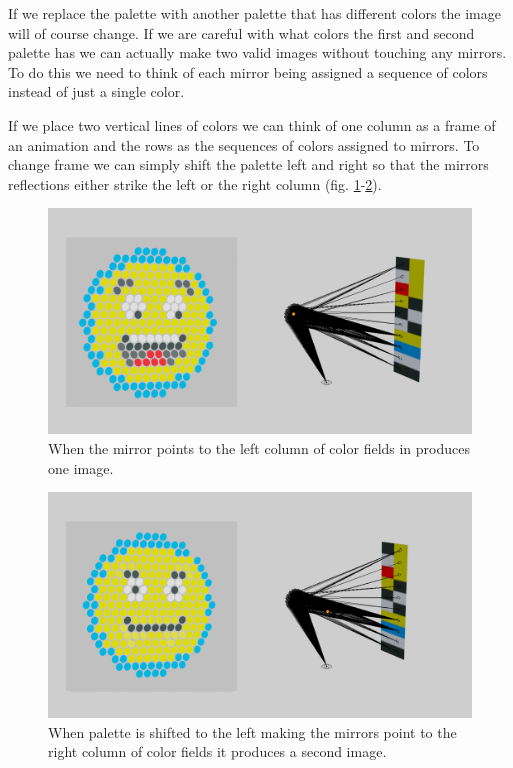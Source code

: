 \documentclass{article}
\begin{document}
If we replace the palette with another palette that has different
colors the image will of course change. If we are careful with what
colors the first and second palette has we can actually make two valid
images without touching any mirrors. To do this we need to think of each
mirror being assigned a sequence of colors instead of just a single
color.

If we place two vertical lines of colors we can think of one column as
a frame of an animation and the rows as the sequences of colors
assigned to mirrors. To change frame we can simply shift the palette
left and right so that the mirrors reflections either strike the left or
the right column (fig. \ref{fig:two_image_3d_frame1}-\ref{fig:two_image_3d_frame2}).


\begin{figure}[ht!]
\centering
\includegraphics[width=\textwidth]{images/two-image-3d-frame1.png}
\caption{When the mirror points to the left column of color fields in produces one image.}
\label{fig:two_image_3d_frame1}
\end{figure}

\begin{figure}[ht!]
\centering
\includegraphics[width=\textwidth]{images/two-image-3d-frame2.png}
\caption{When palette is shifted to the left making the mirrors point to the right column of color fields it produces a second image.}
\label{fig:two_image_3d_frame2}
\end{figure}
\end{document}
